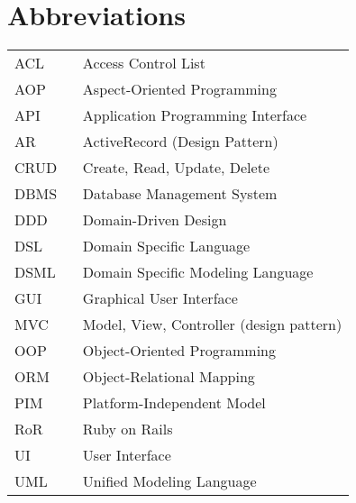 \chapter*{Abbreviations}

\begin{flushleft}
\begin{tabular}{l p{0.8\linewidth}}
ACL       & Access Control List\\
AOP       & Aspect-Oriented Programming\\
API       & Application Programming Interface\\
AR        & ActiveRecord (Design Pattern)\\
CRUD      & Create, Read, Update, Delete\\
DBMS      & Database Management System\\
DDD       & Domain-Driven Design\\
DSL       & Domain Specific Language\\
DSML      & Domain Specific Modeling Language\\
GUI       & Graphical User Interface\\
MVC       & Model, View, Controller (design pattern)\\
OOP       & Object-Oriented Programming\\
ORM       & Object-Relational Mapping\\
PIM       & Platform-Independent Model\\
RoR       & Ruby on Rails\\
UI        & User Interface\\
UML       & Unified Modeling Language\\
\end{tabular}
\end{flushleft}
